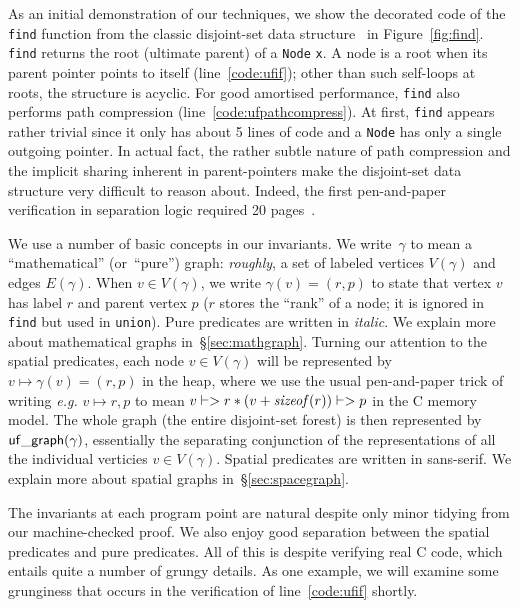 

As an initial demonstration of our techniques, we show the decorated code of the 
\texttt{find} function from the classic disjoint-set data structure~\cite{blah} in 
Figure~\ref{fig:find}. \texttt{find} returns the root 
(ultimate parent) of a \texttt{Node} \texttt{x}. A node is a root when its parent 
pointer points to itself (line~\ref{code:ufif}); 
other than such self-loops at roots, the structure is acyclic. 
For good amortised performance, \texttt{find} also performs path 
compression (line~\ref{code:ufpathcompress}).
At first, \texttt{find} appears rather trivial since it only has about 5 lines 
of code and a \texttt{Node} has only a single outgoing pointer.  
In actual fact, the rather subtle nature of path compression and the 
implicit sharing inherent in parent-pointers make the disjoint-set data 
structure very difficult to reason about. Indeed, the first pen-and-paper 
verification in separation logic required 20 pages~\cite{neelthesis}.

We use a number of basic concepts in our invariants.  We write~$\gamma$ to 
mean a ``mathematical'' (or~``pure'') graph: \emph{roughly}, a set of 
labeled vertices {\color{magenta}$V(\gamma)$ and edges $E(\gamma)$.} 
When $v \in V(\gamma)$, we write $\gamma(v) = (r,p)$ to state that vertex $v$ has 
label $r$ and parent vertex $p$ ($r$ stores the ``rank'' of a node; it is ignored 
in \texttt{find} but used in \texttt{union}).  Pure predicates are written in 
\textit{italic}.  We explain more about mathematical graphs in~\S\ref{sec:mathgraph}. 
Turning our attention to the spatial predicates, each node $v \in V(\gamma)$ will be 
represented by {\color{orange}$v \mapsto \gamma(v) = (r,p)$} in the heap, 
where we use the usual pen-and-paper 
trick of writing \emph{e.g.} $v \mapsto r,p$ to mean 
\mbox{\color{orange}$v |-> r * (v + \mathit{sizeof}(r)) |-> p$} in the C memory model.
The whole graph (the entire disjoint-set forest) is then represented by 
$\mathsf{uf\_graph}(\gamma)$, {\color{magenta}essentially the 
separating conjunction of} the representations 
of all the individual verticies $v \in V(\gamma)$. 
{\color{magenta}Spatial predicates are written in \textsf{sans-serif}.}  
We explain more about spatial graphs in~\S\ref{sec:spacegraph}.

The invariants at 
each program point are natural despite only minor tidying from our machine-checked 
proof.  We also enjoy good separation between the spatial predicates and pure 
predicates.  All of this is despite verifying real C code, which entails quite a number 
of grungy details. As one example, we will examine some grunginess that occurs in the 
verification of line~\ref{code:ufif} shortly.

